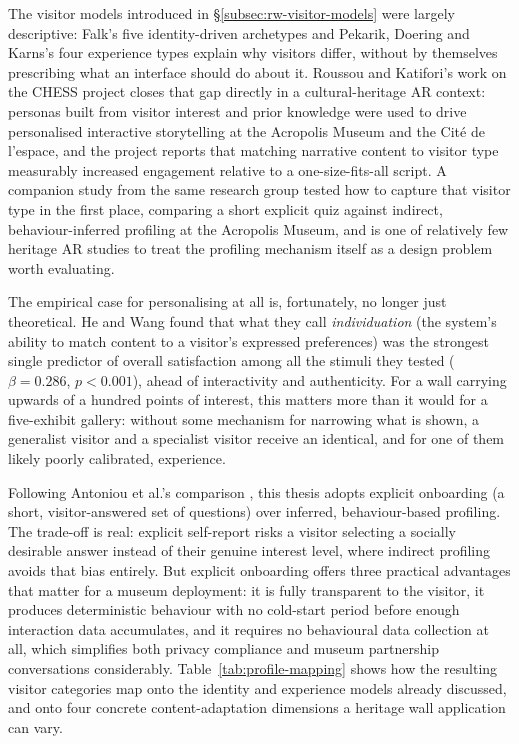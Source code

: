 The visitor models introduced in \S\ref{subsec:rw-visitor-models} were largely
descriptive: Falk's five identity-driven archetypes \cite{falk2009} and Pekarik,
Doering and Karns's four experience types \cite{pekarik1999} explain why visitors
differ, without by themselves prescribing what an interface should do about it.
Roussou and Katifori's work on the CHESS project \cite{roussoukatifori2018}
closes that gap directly in a cultural-heritage AR context: personas built from
visitor interest and prior knowledge were used to drive personalised interactive
storytelling at the Acropolis Museum and the Cité de l'espace, and the project
reports that matching narrative content to visitor type measurably increased
engagement relative to a one-size-fits-all script. A companion study from the same
research group \cite{antoniou2016} tested how to capture that visitor type in the
first place, comparing a short explicit quiz against indirect, behaviour-inferred
profiling at the Acropolis Museum, and is one of relatively few heritage AR studies
to treat the profiling mechanism itself as
a design problem worth evaluating.

The empirical case for personalising at all is, fortunately, no longer just
theoretical. He and Wang \cite{hewang2025} found that what they call
\emph{individuation} (the system's ability to match content to a visitor's expressed preferences) was the strongest single predictor of overall satisfaction
among all the stimuli they tested ($\beta = 0.286$, $p < 0.001$), ahead of
interactivity and authenticity. For a wall carrying upwards of a hundred points of
interest, this matters more than it would for a five-exhibit gallery: without some
mechanism for narrowing what is shown, a generalist visitor and a specialist visitor
receive an identical, and for one of them likely poorly calibrated, experience.

Following Antoniou et al.'s comparison \cite{antoniou2016}, this thesis adopts
explicit onboarding (a short, visitor-answered set of questions) over
inferred, behaviour-based profiling. The trade-off is real: explicit self-report
risks a visitor selecting a socially desirable answer instead of their genuine
interest level, where indirect profiling avoids that bias entirely. But explicit
onboarding offers three practical advantages that matter for a museum deployment:
it is fully transparent to the visitor, it produces deterministic behaviour with no
cold-start period before enough interaction data accumulates, and it requires no
behavioural data collection at all, which simplifies both privacy compliance and
museum partnership conversations considerably. Table~\ref{tab:profile-mapping} shows
how the resulting visitor categories map onto the identity and experience models
already discussed, and onto four concrete content-adaptation dimensions a heritage
wall application can vary.

